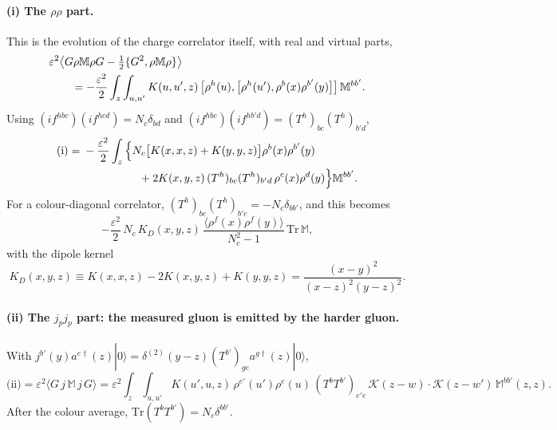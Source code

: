 \documentclass[aps,prd,onecolumn,superscriptaddress,nofootinbib,floatfix,longbibliography,11pt]{revtex4-2}
\numberwithin{equation}{section}
\newcommand{\KK}{\mathcal{K}}
\newcommand{\Tr}{\mathrm{Tr}}
\begin{document}
\paragraph*{(i) The $\rho\rho$ part.} This is the evolution of the charge correlator itself, with real and virtual parts,
\begin{align}
&\varepsilon^2\big\langle G\rho\mathbb M\rho G-\tfrac12\{G^2,\rho\mathbb M\rho\}\big\rangle\notag\\
&\qquad=-\frac{\varepsilon^2}{2}\int_z\int_{u,u'}K(u,u',z)\,\big[\rho^h(u),\big[\rho^h(u'),\rho^b(x)\rho^{b'}(y)\big]\big]\,\mathbb M^{bb'}.
\end{align}
Using $(if^{hbc})(if^{hcd})=N_c\delta_{bd}$ and $(if^{hbc})(if^{hb'd})=(T^h)_{bc}(T^h)_{b'd}$,
\begin{align}
\text{(i)}={}&-\frac{\varepsilon^2}{2}\int_z\Big\{N_c\big[K(x,x,z)+K(y,y,z)\big]\rho^b(x)\rho^{b'}(y)\notag\\
&\hspace{5em}+2K(x,y,z)\,(T^h)_{bc}(T^h)_{b'd}\,\rho^c(x)\rho^d(y)\Big\}\mathbb M^{bb'}.
\end{align}
For a colour-diagonal correlator, $(T^h)_{bc}(T^h)_{b'c}=-N_c\delta_{bb'}$, and this becomes
\begin{equation}
-\frac{\varepsilon^2}{2}\,N_c\,K_D(x,y,z)\,\frac{\langle\rho^f(x)\rho^f(y)\rangle}{N_c^2-1}\,\Tr\,\mathbb M,
\end{equation}
with the dipole kernel
\begin{equation}
K_D(x,y,z)\equiv K(x,x,z)-2K(x,y,z)+K(y,y,z)=\frac{(x-y)^2}{(x-z)^2(y-z)^2}.
\label{eq:KD}
\end{equation}

\paragraph*{(ii) The $j_pj_p$ part: the measured gluon is emitted by the harder gluon.} With $j^{b'}(y)a^{e\dagger}(z)|0\rangle=\delta^{(2)}(y-z)(T^{b'})_{ge}a^{g\dagger}(z)|0\rangle$,
\begin{equation}
\text{(ii)}=\varepsilon^2\langle G\,j\,\mathbb M\,j\,G\rangle=\varepsilon^2\int_z\int_{u,u'}K(u',u,z)\,\rho^{e'}(u')\rho^e(u)\,(T^bT^{b'})_{e'e}\,\KK(z-w)\cdot\KK(z-w')\,\mathbb M^{bb'}(z,z).
\end{equation}
After the colour average, $\Tr(T^bT^{b'})=N_c\delta^{bb'}$.
\end{document}
